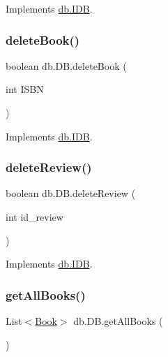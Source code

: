 Implements \hyperlink{interfacedb_1_1_i_d_b_a2ac985a90e8369fab676950b3fb4c2bc}{db.\+I\+DB}.

\mbox{\label{classdb_1_1_d_b_a712d418878efa15112c62eb6db4b022d}} 
\subsubsection{\texorpdfstring{delete\+Book()}{deleteBook()}}
{\footnotesize\ttfamily boolean db.\+D\+B.\+delete\+Book (\begin{DoxyParamCaption}\item[{int}]{I\+S\+BN }\end{DoxyParamCaption})}



Implements \hyperlink{interfacedb_1_1_i_d_b_a8fa065455c75f33b9713b8d5058a0e30}{db.\+I\+DB}.

\mbox{\label{classdb_1_1_d_b_ab3664756678e77a9f1b9c6c93c81d691}} 
\subsubsection{\texorpdfstring{delete\+Review()}{deleteReview()}}
{\footnotesize\ttfamily boolean db.\+D\+B.\+delete\+Review (\begin{DoxyParamCaption}\item[{int}]{id\+\_\+review }\end{DoxyParamCaption})}



Implements \hyperlink{interfacedb_1_1_i_d_b_a37810242fa48895f21f790ef6a367225}{db.\+I\+DB}.

\mbox{\label{classdb_1_1_d_b_ab4fbfd3716967ce37cc462ca04c68ca8}} 
\subsubsection{\texorpdfstring{get\+All\+Books()}{getAllBooks()}}
{\footnotesize\ttfamily List$<$\hyperlink{classserver_1_1data_1_1_book}{Book}$>$ db.\+D\+B.\+get\+All\+Books (\begin{DoxyParamCaption}{ }\end{DoxyParamCaption})}



